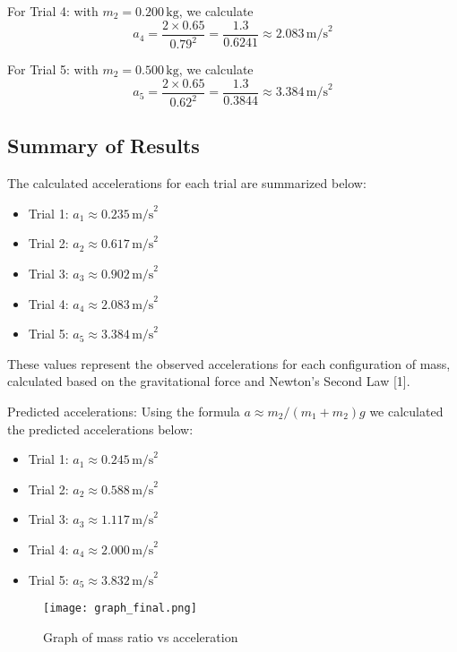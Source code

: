 For Trial 4: with \( m_2 = 0.200 \, \text{kg} \), we calculate
\[
a_4 = \frac{2 \times 0.65}{0.79^2} = \frac{1.3}{0.6241} \approx 2.083 \, \text{m/s}^2
\]

For Trial 5: with \( m_2 = 0.500 \, \text{kg} \), we calculate
\[
a_5 = \frac{2 \times 0.65}{0.62^2} = \frac{1.3}{0.3844} \approx 3.384 \, \text{m/s}^2
\]

\subsection{Summary of Results}

The calculated accelerations for each trial are summarized below:

\begin{itemize}
    \item Trial 1: \( a_1 \approx 0.235 \, \text{m/s}^2 \)
    \item Trial 2: \( a_2 \approx 0.617 \, \text{m/s}^2 \)
    \item Trial 3: \( a_3 \approx 0.902 \, \text{m/s}^2 \)
    \item Trial 4: \( a_4 \approx 2.083 \, \text{m/s}^2 \)
    \item Trial 5: \( a_5 \approx 3.384 \, \text{m/s}^2 \)
\end{itemize}

These values represent the observed accelerations for each configuration of mass, calculated based on the gravitational force and Newton's Second Law [1].

Predicted accelerations:
Using the formula \( a \approx m_2/(m_1+m_2) g \) we calculated the predicted accelerations below:
\begin{itemize}
    \item Trial 1: \( a_1 \approx 0.245 \, \text{m/s}^2 \)
    \item Trial 2: \( a_2 \approx 0.588 \, \text{m/s}^2 \)
    \item Trial 3: \( a_3 \approx 1.117 \, \text{m/s}^2 \)
    \item Trial 4: \( a_4 \approx 2.000 \, \text{m/s}^2 \)
    \item Trial 5: \( a_5 \approx 3.832 \, \text{m/s}^2 \)
\end{itemize}




\begin{figure}
    \centering
    \texttt{[image: graph\_final.png]}
    \caption{Graph of mass ratio vs acceleration}
    \label{fig:graph}
\end{figure}
